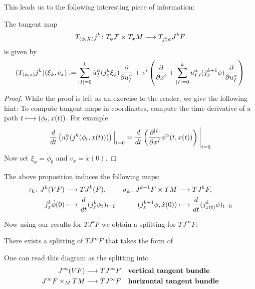 This leads us to the following interesting piece of information:

\begin{prop}
  The tangent map
  $$ T_{(\phi,X)}j^k \colon T_\phi \FF \times T_x M \lra T_{j^k_x \phi} J^k F $$
  is given by
  $$ (T_{(\phi, x)} j^k)(\xi_\phi, v_x) := \sum_{|I|=0}^k \dot u^\alpha_I (j^k_x \xi_\phi) \dell{}{u^\alpha_I} + v^i \left( \dell{}{x^i} + \sum_{|I|=0}^k u^\alpha_{I,i} (j^{k+1}_x \phi) \dell{}{u^\alpha_I} \right) $$
\begin{proof}
  While the proof is left as an exercise to the reader, we give the following hint: To compute tangent maps in coordinates, compute the time derivative of a path $t \lmap (\phi_t, x(t))$. For example
  $$ \dd{}{t}\left( u^\alpha_I (j^k(\phi_t, x(t))) \right)\Big|_{t=0} = \dd{}{t}\left( \dell{^{|I|}}{x^I} \phi^\alpha(t, x(t)) \right)\Bigg|_{t=0} $$
  Now set $\xi_\phi = \dot \phi_0$ and $v_x = \dot x(0)$.
\end{proof}
\end{prop}

\begin{rem}
  The above proposition induces the following maps:
  \begin{align*}
    \tau_k \colon J^k(VF) &\lra TJ^k(F), & \sigma_k \colon J^{k+1}F \times TM &\lra TJ^k F,\\
    j^k_x \dot\phi(0) &\lmap \dd{}{t}(j^k_x\phi_t)_{t=0} & (j^{k+1}_x \phi, \dot x(0)) &\lmap \dd{}{t}( j^k_{x(t)} \phi)_{t=0}
  \end{align*}
\end{rem}

Now using our results for $TJ^kF$ we obtain a splitting for $TJ^\infty F$:

\begin{theo}
  There exists a splitting of $TJ^\infty F$ that takes the form of
  \begin{center}
  \end{center}
  One can read this diagram as the splitting into
  \begin{align*}
    J^\infty(VF) & \longrightarrow TJ^\infty F \quad \textbf{vertical tangent bundle}\\
    J^\infty F \times_M TM & \longrightarrow TJ^\infty F \quad \textbf{horizontal tangent bundle}
  \end{align*}
\end{theo}


